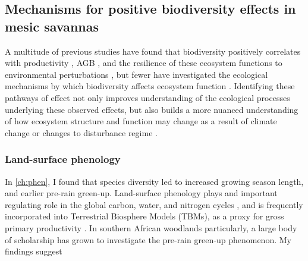 \begin{refsection}



\subsection{Mechanisms for positive biodiversity effects in mesic savannas}

A multitude of previous studies have found that biodiversity positively correlates with productivity \citep{}, AGB \citep{}, and the resilience of these ecosystem functions to environmental perturbations \citep{}, but fewer have investigated the ecological mechanisms by which biodiversity affects ecosystem function \citep{}. Identifying these pathways of effect not only improves understanding of the ecological processes underlying these observed effects, but also builds a more nuanced understanding of how ecosystem structure and function may change as a result of climate change or changes to disturbance regime \citep{}.

\subsubsection{Land-surface phenology}

In \autoref{ch:phen}, I found that species diversity led to increased growing season length, and earlier pre-rain green-up. Land-surface phenology plays and important regulating role in the global carbon, water, and nitrogen cycles \citep{Richardson2013}, and is frequently incorporated into Terrestrial Biosphere Models (TBMs), as a proxy for gross primary productivity \citep{Bloom2016}. In southern African woodlands particularly, a large body of scholarship has grown to investigate the pre-rain green-up phenomenon. My findings suggest


\end{refsection}
